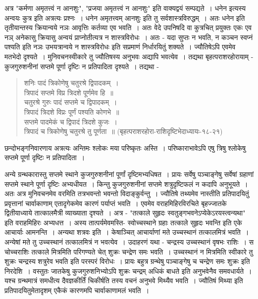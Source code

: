 {अत्र "कर्मणा अमृतत्त्वं न आनशुः", "प्रजया अमृतत्त्वं न आनशुः" इति वाक्यद्वयं सम्पद्यते~। धनेन इत्यस्य अन्वयः कुत्र इति अत्रत्यः प्रश्नः~। धनेन अमृतत्त्वम् आनशुः इति तु सर्वशास्त्रविरुद्धम्~। अतः धनेन इति तृतीयान्तस्य क्रियान्वये नञः आवृत्तिः कर्तव्या एव भवति~। अतः वेदे उपनिषदि वा कुत्रचित् प्रयुक्तः एकः एव नञ् अनेकासु क्रियासु अन्वयं प्राप्नोतीत्यत्र न शास्त्रविरोधः~। अतः - यदा सुप्तः न भवति, न कञ्चन स्वप्नं पश्यति इति नञः उभयत्रान्वये न शास्त्रविरोधः इति सप्रमाणं निर्धारयितुं शक्यते~। ज्यौतिषेऽपि एवमेव मतभेदो दृश्यते~। मुनिवचनस्वीकारे तु ज्यौतिषस्य अनुभवः अद्यापि भवत्येव~। तद्यथा बृहत्पराशरहोरायाम् - कुजगुरुशनीनां सप्तमे पूर्णा दृष्टिः न प्रतिपादिता दृश्यते~। तद्यथा -
\begin{verse}
शनिः पादं त्रिकोणेषु चतुरश्रे द्विपादकम्~। \\
त्रिपादं सप्तमे विप्र त्रिदशे पूर्णमेव हि~॥\\
चतुरश्रे गुरुः पादं सप्तमे च द्विपादकम्~। \\
त्रिपादं त्रिदशे विप्रः पूर्णं पश्यति कोणभे~॥\\
सप्तमे पादमेकं च द्विपादं त्रिदशे कुजः~। \\
त्रिपादं च त्रिकोणेषु चतुरश्रे तु पूर्णता~॥ (बृहत्पराशरहोरा-राशिदृष्टिभेदाध्यायः-१८-२१)
\end{verse}
छन्दोभङ्गनिवारणाय अत्रत्यः अन्तिमः श्लोकः मया परिष्कृतः अस्ति~। परिष्काराभावेऽपि एषु त्रिषु श्लोकेषु सप्तमे पूर्णा दृष्टिः न प्रतिपादिता~।  

अन्ये ग्रन्थकारास्तु सप्तमे स्थाने कुजगुरुशनीनां पूर्णां दृष्टिमभ्यधिषत~। प्रायः सर्वेषु पञ्चाङ्गेषु सर्वेषां ग्रहाणां सप्तमे स्थाने पूर्णा दृष्टिः अभ्यधीयत~। किन्तु कुजगुरुशनीनां सप्तमे शत्रुदृष्टिफलं न कदापि अनुभूयते~। अतः अत्र मुनिवचनमेव वरमिति तत्रभवन्तो भवन्तो विदाङ्कुर्वन्तु~। ज्यौतिषे तथ्यमेव नास्तीति प्रतिपादयितुं प्रवृत्तानां चार्वाकाणाम् एतादृगेकमेव कारणं पर्याप्तं भवति~। एवमेव वराहमिहिरविरचिते बृहज्जातके द्वितीयाध्याये तात्कालमैत्री व्याख्याता दृश्यते~। अत्र - "तत्काले सुहृदः स्वतुङ्गभवनेऽप्येकेऽरयस्त्वन्यथा" इति वराहमिहिरः अभ्यधत्त~। अस्य तात्पर्यमेवमस्ति- स्वोच्चस्थाने ग्रहाः तत्काले  सुहृदः भवन्ति इति एके आचार्याः आमनन्ति~। अन्यथा शत्रवः इति~। केषाञ्चित् आचार्याणां मते उच्चस्थानं तत्कालमित्रं भवति~। अन्येषां मते तु उच्चस्थानं तत्कालमित्रं न भवत्येव~। उदाहरणं यथा - चन्द्रस्य उच्चस्थानं वृषभः राशिः~। स चोच्चराशिः तत्काले मित्रमिति परिगण्यते चेत् शुक्रः चन्द्रेण समः भवति~। उच्चस्थानं न मित्रमिति स्वीकारे तु शुक्रः चन्द्रस्य शत्रुरेव भवति इति परस्परं विरोधः~। प्रायः बहुत्र ग्रन्थेषु पञ्चाङ्गेषु च चन्द्रेण समः शुक्रः इति निरदेशि~। वस्तुतः जातकेषु कुजगुरुशनिभ्योऽपि शुक्रः चन्द्रम् अधिकं बाधते इति अनुभवेनैव समवधार्यते~। यश्च ग्रन्थमात्रं समधीत्य दैवज्ञकीर्तिं चिकीर्षति तस्य वचनं अनुभवे मिथ्यैव भवति~। ज्यौतिषं मिथ्या इति प्रतिपादयितुमेतादृशम् एकैकं कारणमपि चार्वाकाणामलं भवति~। 

}

